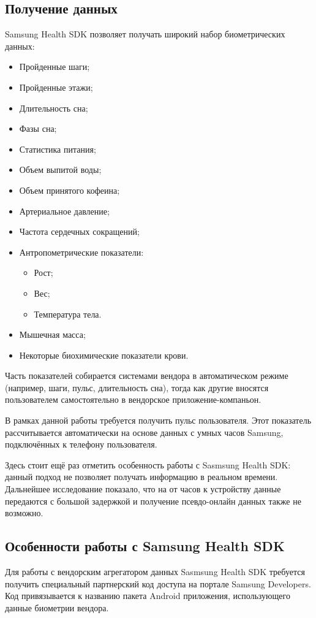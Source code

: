 \subsection{Получение данных}
Samsung Health SDK позволяет получать широкий набор биометрических данных:
\begin{multicols}{2}
	\begin{itemize}
		\item Пройденные шаги;
		\item Пройденные этажи;
		\item Длительность сна;
		\item Фазы сна;
		\item Статистика питания;
		\item Объем выпитой воды;
		\item Объем принятого кофеина;
		\item Артериальное давление;
		\item Частота сердечных сокращений;
		\item Антропометрические показатели:
		\begin{itemize}
			\item Рост;
			\item Вес;
			\item Температура тела.
		\end{itemize}
		\item Мышечная масса;
		\item Некоторые биохимические показатели крови.
	\end{itemize}
\end{multicols}
\smallskip
Часть показателей собирается системами вендора в автоматическом режиме (например, шаги, пульс, длительность сна), тогда как другие \textemdash\space вносятся пользователем самостоятельно в вендорское приложение-компаньон.

В рамках данной работы требуется получить пульс пользователя. Этот показатель рассчитывается автоматически на основе данных с умных часов Samsung, подключённых к телефону пользователя.

Здесь стоит ещё раз отметить особенность работы с Sasmsung Health SDK: данный подход не позволяет получать информацию в реальном времени. Дальнейшее исследование показало, что на от часов к устройству данные передаются с большой задержкой и получение псевдо-онлайн данных также не возможно.

\subsection{Особенности работы с Samsung Health SDK}
Для работы с вендорским агрегатором данных Sasmsung Health SDK требуется получить специальный партнерский код доступа на портале Samsung Developers. Код привязывается к названию пакета Android приложения, использующего данные биометрии вендора.

